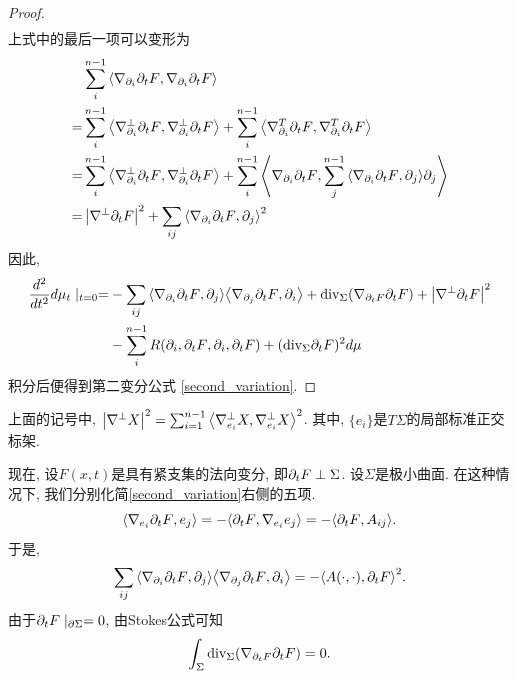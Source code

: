 \begin{proof}
\begin{equation}
\begin{split}
        \end{split}
    \end{equation}
    上式中的最后一项可以变形为
    \begin{equation}
        \begin{split}
            &\sum_{i}^{n-1}{\left < \nabla_{{\partial_i}}{\partial_t F}, \nabla_{{\partial_i}}{\partial_t F} \right >}  \\
            =& \sum_{i}^{n-1}{\left < \nabla^\perp_{{\partial_i}}{\partial_t F}, \nabla^\perp_{{\partial_i}}{\partial_t F} \right >} + \sum_{i}^{n-1}{\left < \nabla^T_{{\partial_i}}{\partial_t F}, \nabla^T_{{\partial_i}}{\partial_t F} \right >} \\
            =& \sum_{i}^{n-1}{\left < \nabla^\perp_{{\partial_i}}{\partial_t F}, \nabla^\perp_{{\partial_i}}{\partial_t F} \right >} + \sum_{i}^{n-1}{\left < \nabla_{{\partial_i}}{\partial_t F}, \sum_{j}^{n-1}{\left < \nabla_{{\partial_i}}{\partial_t F}, {\partial_j} \right >}{\partial_j} \right >} \\
            =&\left | \nabla^\perp {\partial_t F} \right |^2+ \sum_{ij}{\left < \nabla_{{\partial_i}}{\partial_t F}, {\partial_j} \right >}^2
        \end{split}
    \end{equation}
    因此,
    \begin{equation} \label{second_variation_inf}
        \begin{split}
            \frac{d^2}{dt^2} {d\mu_t}\mid_{t=0}= &-\sum_{ij}{\left < \nabla_{{\partial_i}}{\partial_t F}, {\partial_j} \right >}{\left < \nabla_{{\partial_j}}{\partial_t F}, {\partial_i} \right >} +{\text{div}}_{\Sigma}(\nabla_{{\partial_t F}}{\partial_t F}) + \left | \nabla^\perp {\partial_t F} \right |^2 \\
            &- \sum_{i}^{n-1}R({\partial_i},{\partial_t F},{\partial_i},{\partial_t F}) + ({\text{div}}_\Sigma{\partial_t F})^2{d\mu}
        \end{split}
    \end{equation}
    积分后便得到第二变分公式 \eqref{second_variation}.
\end{proof}
\begin{remark}
    上面的记号中, $\left | \nabla^\perp X \right |^2= \sum_{i=1}^{n-1}{\left < \nabla_{e_i}^\perp X, \nabla_{e_i}^\perp X \right >}^2$. 其中, $\{e_i\}$是$T\Sigma$的局部标准正交标架.
\end{remark}
\ifshow
现在, 设$F(x,t)$是具有紧支集的法向变分, 即${\partial_t F} \perp \Sigma$.  设$\Sigma$是极小曲面.  在这种情况下, 我们分别化简\eqref{second_variation}右侧的五项.
\begin{equation}
    {\left < \nabla_{e_i}{\partial_t F}, e_j \right >} = -{\left < {\partial_t F}, \nabla_{e_i}e_j \right >} = -{\left < {\partial_t F}, A_{ij} \right >}.
\end{equation}
于是, 
\begin{equation}
    \sum_{ij}{\left < \nabla_{{\partial_i}}{\partial_t F}, {\partial_j} \right >}{\left < \nabla_{{\partial_j}}{\partial_t F}, {\partial_i} \right >}=-{\left < A(\cdot,\cdot), {\partial_t F} \right >}^2.
\end{equation}
由于${\partial_t F}\mid_{\partial \Sigma}=0$, 由Stokes公式可知
\begin{equation}
    \int_\Sigma {\text{div}}_\Sigma(\nabla_{{\partial_t F}}{\partial_t F})=0.
\end{equation}
